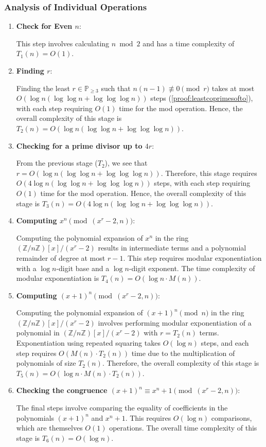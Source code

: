 \documentclass{article}
\theoremstyle{plain}
\theoremstyle{definition}
\newcommand{\Z}{\mathbb{Z}}
\begin{document}
\subsubsection{Analysis of Individual Operations}
\begin{enumerate}
    \item \textbf{Check for Even $n$}:
    
        This step involves calculating $n \bmod{2}$ and has a time complexity of $T_1(n) = O(1)$.

    \item \textbf{Finding $r$}:
    
        Finding the least $r \in \mathbb{P}_{\geq 3}$ such that $n(n-1) \not\equiv 0 \pmod{r}$ takes at most $O(\log n (\log \log n + \log \log \log n))$ steps (\cref{proof:leastcoprimesofto}), with each step requiring $O(1)$ time for the mod operation. Hence, the overall complexity of this stage is $ T_2(n) = O(\log n (\log \log n + \log \log \log n))$.

    \item \textbf{Checking for a prime divisor up to $4r$}:
    
        From the previous stage ($T_2$), we see that $r = O(\log n (\log \log n + \log \log \log n))$. Therefore, this stage requires $O(4 \log n (\log \log n + \log \log \log n))$ steps, with each step requiring $O(1)$ time for the mod operation. Hence, the overall complexity of this stage is $T_3(n) = O(4 \log n (\log \log n + \log \log \log n))$.

    \item \textbf{Computing $x^n \pmod{(x^r-2,n)}$}:
    
        Computing the polynomial expansion of $x^n$ in the ring $(\Z/n\Z)[x]/(x^r-2)$ results in intermediate terms and a polynomial remainder of degree at most $r-1$. This step requires modular exponentiation with a $\log n$-digit base and a $\log n$-digit exponent. The time complexity of modular exponentiation is $ T_4(n) = O(\log n \cdot M(n))$.

    \item \textbf{Computing $(x+1)^n \pmod{(x^r-2,n)}$}:
    
        Computing the polynomial expansion of $(x+1)^n \pmod{n}$ in the ring $(\Z/n\Z)[x]/(x^r-2)$ involves performing modular exponentiation of a polynomial in $(\Z/n\Z)[x]/(x^r-2)$ with $r = T_2(n)$ terms. Exponentiation using repeated squaring takes $O(\log n)$ steps, and each step requires $O(M(n) \cdot T_2(n))$ time due to the multiplication of polynomials of size $T_2(n)$. Therefore, the overall complexity of this stage is $ T_5(n) = O(\log n \cdot  M(n) \cdot  T_2(n))$.
         
    \item \textbf{Checking the congruence $(x+1)^n \equiv x^n+1 \pmod{(x^r-2,n)}$}:
    
    The final steps involve comparing the equality of coefficients in the polynomials $(x+1)^n$ and $x^n+1$. This requires $O(\log n)$ comparisons, which are themselves $O(1)$ operations. The overall time complexity of this stage is $T_6(n) = O(\log n)$.
\end{enumerate}
\end{document}
